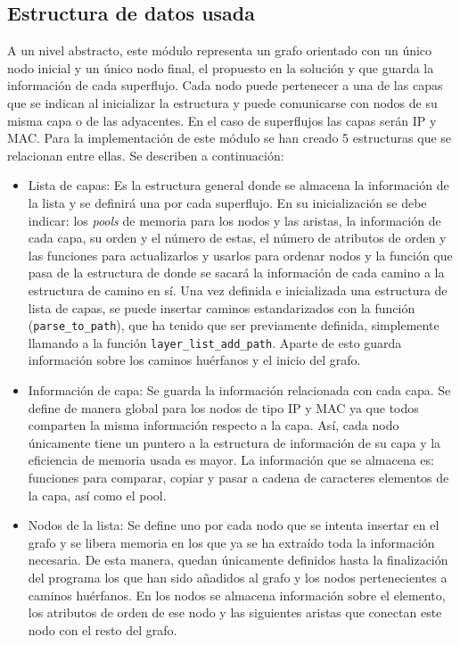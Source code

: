 \documentclass[tfg,epsbased,lof,lot,loa,covers,final,copyright,overleaf]{tfgtfmthesisuam}
\begin{document}
\subsection{Estructura de datos usada}
A un nivel abstracto, este módulo representa un grafo orientado con un único nodo inicial y un único nodo final, el propuesto en la solución y que guarda la información de cada superflujo. Cada nodo puede pertenecer a una de las capas que se indican al inicializar la estructura y puede comunicarse con nodos de su misma capa o de las adyacentes. En el caso de superflujos las capas serán IP y MAC. Para la implementación de este módulo se han creado 5 estructuras que se relacionan entre ellas. Se describen a continuación:
\begin{itemize}
    \item Lista de capas: Es la estructura general donde se almacena la información de la lista y se definirá una por cada superflujo. En su inicialización se debe indicar: los \textit{pools} de memoria para los nodos y las aristas, la información de cada capa, su orden y el número de estas, el número de atributos de orden y las funciones para actualizarlos y usarlos para ordenar nodos y la función que pasa de la estructura de donde se sacará la información de cada camino a la estructura de camino en sí. Una vez definida e inicializada una estructura de lista de capas, se puede insertar caminos estandarizados con la función (\texttt{parse\_to\_path}), que ha tenido que ser previamente definida, simplemente llamando a la función \texttt{layer\_list\_add\_path}. Aparte de esto guarda información sobre los caminos huérfanos y el inicio del grafo.
    \item Información de capa: Se guarda la información relacionada con cada capa. Se define de manera global para los nodos de tipo IP y MAC ya que todos comparten la misma información respecto a la capa. Así, cada nodo únicamente tiene un puntero a la estructura de información de su capa y la eficiencia de memoria usada es mayor. La información que se almacena es: funciones para comparar, copiar y pasar a cadena de caracteres elementos de la capa, así como el \gls{pool}.
    \item Nodos de la lista: Se define uno por cada nodo que se intenta insertar en el grafo y se libera memoria en los que ya se ha extraído toda la información necesaria. De esta manera, quedan únicamente definidos hasta la finalización del programa los que han sido añadidos al grafo y los nodos pertenecientes a caminos huérfanos.  En los nodos se almacena información sobre el elemento, los atributos de orden de ese nodo y las siguientes aristas que conectan este nodo con el resto del grafo.

\end{itemize}
\end{document}
